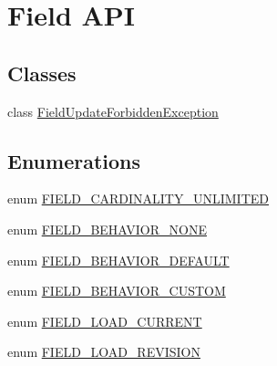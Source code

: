 \hypertarget{group__field}{
\section{Field API}
\label{group__field}
}
\subsection*{Classes}
\begin{DoxyCompactItemize}
\item 
class \hyperlink{classFieldUpdateForbiddenException}{FieldUpdateForbiddenException}
\end{DoxyCompactItemize}
\subsection*{Enumerations}
\begin{DoxyCompactItemize}
\item 
enum \hyperlink{group__field_gac14c9ab18aca82aebcbc6cfa511964fc}{FIELD\_\-CARDINALITY\_\-UNLIMITED} 
\item 
enum \hyperlink{group__field_gabff95904b186d355153ceda1f3941975}{FIELD\_\-BEHAVIOR\_\-NONE} 
\item 
enum \hyperlink{group__field_ga9549af1a8f86107fbafc0e3425ec7629}{FIELD\_\-BEHAVIOR\_\-DEFAULT} 
\item 
enum \hyperlink{group__field_gae4cb2db55750703aae033c7b2cd8c465}{FIELD\_\-BEHAVIOR\_\-CUSTOM} 
\item 
enum \hyperlink{group__field_ga39b9fb0d47b181607a4d981a9bccbe8a}{FIELD\_\-LOAD\_\-CURRENT} 
\item 
enum \hyperlink{group__field_ga6eae4d17256be446f837da1a360f0096}{FIELD\_\-LOAD\_\-REVISION} 
\end{DoxyCompactItemize}
